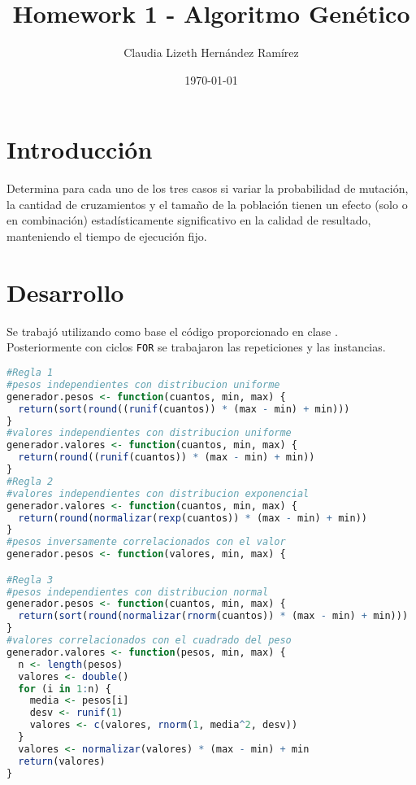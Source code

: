\documentclass{article}
\author{Claudia Lizeth Hern\'andez Ram\'irez} %
\title{Homework 1 - Algoritmo Gen\'etico} %
\date{\today}
\begin{document}

\maketitle %



\section{Introducci\'{o}n}\label{intro} %
Determina para cada uno de los tres casos si variar la probabilidad de mutaci\'on, la cantidad de cruzamientos y el tamaño de la poblaci\'on tienen un efecto (solo o en combinaci\'on) estad\'isticamente significativo en la calidad de resultado, manteniendo el tiempo de ejecuci\'on fijo.


\section{Desarrollo}\label{desarrollo} %

Se trabaj\'o utilizando como base el c\'odigo proporcionado en clase \citep{Cbase}. Posteriormente con ciclos \texttt{FOR} se trabajaron las repeticiones y las instancias.

\begin{lstlisting}[language=R, caption= Segmento de c\'odigo Reglas \texttt{1, 2 y 3}.]
#Regla 1
#pesos independientes con distribucion uniforme
generador.pesos <- function(cuantos, min, max) {
  return(sort(round((runif(cuantos)) * (max - min) + min)))
}
#valores independientes con distribucion uniforme
generador.valores <- function(cuantos, min, max) {
  return(round((runif(cuantos)) * (max - min) + min))
}
#Regla 2
#valores independientes con distribucion exponencial
generador.valores <- function(cuantos, min, max) {
  return(round(normalizar(rexp(cuantos)) * (max - min) + min))
}
#pesos inversamente correlacionados con el valor
generador.pesos <- function(valores, min, max) {

#Regla 3
#pesos independientes con distribucion normal
generador.pesos <- function(cuantos, min, max) {
  return(sort(round(normalizar(rnorm(cuantos)) * (max - min) + min)))
}
#valores correlacionados con el cuadrado del peso
generador.valores <- function(pesos, min, max) {
  n <- length(pesos)
  valores <- double()
  for (i in 1:n) {
    media <- pesos[i]
    desv <- runif(1)
    valores <- c(valores, rnorm(1, media^2, desv))
  }
  valores <- normalizar(valores) * (max - min) + min
  return(valores)
}
\end{lstlisting}
\end{document}
